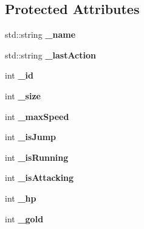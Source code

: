 \subsection*{Protected Attributes}
\begin{DoxyCompactItemize}
\item 
\hypertarget{class_characters_aa07da1842926f30143e7504fb6cbeb18}{std\+::string {\bfseries \+\_\+name}}\label{class_characters_aa07da1842926f30143e7504fb6cbeb18}

\item 
\hypertarget{class_characters_a7fd13ae98277d01b16ad744852d5bd9a}{std\+::string {\bfseries \+\_\+last\+Action}}\label{class_characters_a7fd13ae98277d01b16ad744852d5bd9a}

\item 
\hypertarget{class_characters_a1ea81e7d8e2bfb27f9a55b9aa6fbdd2a}{int {\bfseries \+\_\+id}}\label{class_characters_a1ea81e7d8e2bfb27f9a55b9aa6fbdd2a}

\item 
\hypertarget{class_characters_aceee7dd6aae36a7eacefcc276f3423c0}{int {\bfseries \+\_\+size}}\label{class_characters_aceee7dd6aae36a7eacefcc276f3423c0}

\item 
\hypertarget{class_characters_a71736ea7efb50f0174865607d715c8f1}{int {\bfseries \+\_\+max\+Speed}}\label{class_characters_a71736ea7efb50f0174865607d715c8f1}

\item 
\hypertarget{class_characters_a05cdafb4f63caae675982af22c32fba5}{int {\bfseries \+\_\+is\+Jump}}\label{class_characters_a05cdafb4f63caae675982af22c32fba5}

\item 
\hypertarget{class_characters_a9a8242e24955e5a0c75e69598687c55f}{int {\bfseries \+\_\+is\+Running}}\label{class_characters_a9a8242e24955e5a0c75e69598687c55f}

\item 
\hypertarget{class_characters_a19ecafdcd8a707d8b3e0fe3c7069b99e}{int {\bfseries \+\_\+is\+Attacking}}\label{class_characters_a19ecafdcd8a707d8b3e0fe3c7069b99e}

\item 
\hypertarget{class_characters_a08ee77521ac4ceaf02fc663e41251e6d}{int {\bfseries \+\_\+hp}}\label{class_characters_a08ee77521ac4ceaf02fc663e41251e6d}

\item 
\hypertarget{class_characters_a0241edb650c393cb538d086c7f3841eb}{int {\bfseries \+\_\+gold}}\label{class_characters_a0241edb650c393cb538d086c7f3841eb}


\end{DoxyCompactItemize}
